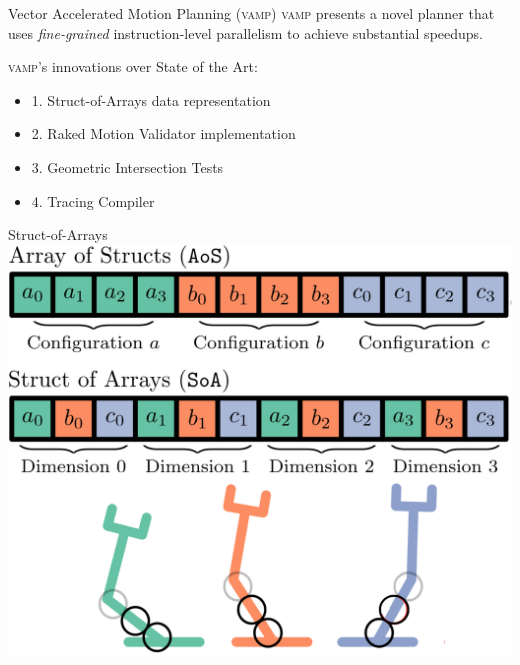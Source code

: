 \documentclass{beamer}
\begin{document}
\begin{frame}{Vector Accelerated Motion Planning (\textsc{vamp})}
\textsc{vamp} presents a novel planner that uses \textit{fine-grained} instruction-level parallelism to achieve substantial speedups.

\vspace{10px}

\pause
\textsc{vamp}'s innovations over State of the Art:
\begin{itemize}
\item 1. Struct-of-Arrays data representation
\item 2. Raked Motion Validator implementation
\item 3. Geometric Intersection Tests
\item 4. Tracing Compiler
\end{itemize}
\end{frame}

\begin{frame}{Struct-of-Arrays}
\centering
\includegraphics[height=0.8\textheight]{./assets/soa_aos_bar.png}
\end{frame}
\end{document}
